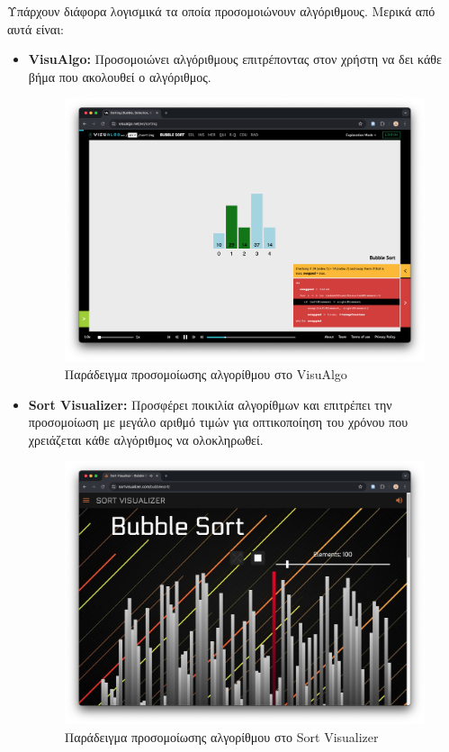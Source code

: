 Υπάρχουν διάφορα λογισμικά τα οποία προσομοιώνουν αλγόριθμους. Μερικά από αυτά είναι:
\begin{itemize}
    \item \textbf{VisuAlgo\cite{noauthor_visualising_nodate}:} Προσομοιώνει αλγόριθμους επιτρέποντας στον χρήστη να δει κάθε βήμα που ακολουθεί ο αλγόριθμος.

    \begin{figure}[H]
        \centering
        \includegraphics[width=0.8\linewidth]{sections/2/images/visualgo}
        \caption{Παράδειγμα προσομοίωσης αλγορίθμου στο VisuAlgo}
        \label{fig:visualgo}
    \end{figure}
    
    \item \textbf{Sort Visualizer\cite{noauthor_sort_nodate}:} Προσφέρει ποικιλία αλγορίθμων και επιτρέπει την προσομοίωση με μεγάλο αριθμό τιμών για οπτικοποίηση του χρόνου που χρειάζεται κάθε αλγόριθμος να ολοκληρωθεί.

    \begin{figure}[H]
        \centering
        \includegraphics[width=0.8\linewidth]{sections/2/images/sort_visualizer}
        \caption{Παράδειγμα προσομοίωσης αλγορίθμου στο Sort Visualizer}
        \label{fig:sort_visualizer}
    \end{figure}
\end{itemize}


